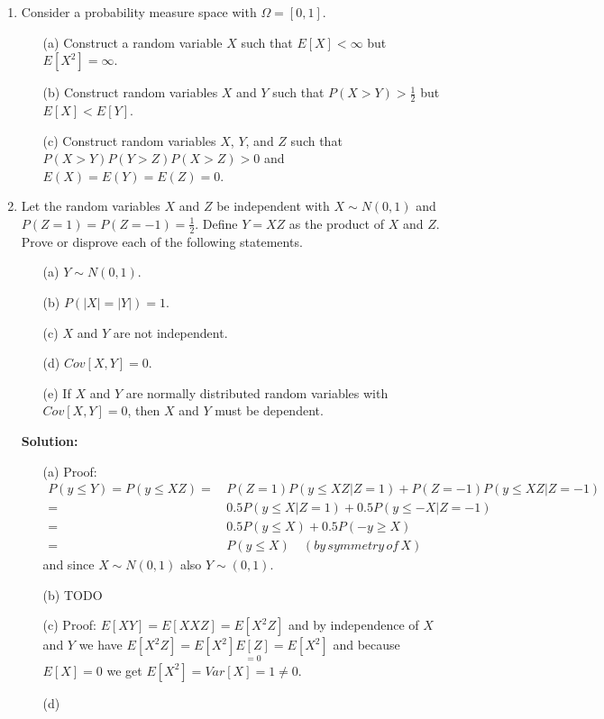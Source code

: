 \documentclass[letterpaper,12pt]{article}
\theoremstyle{definition}
\begin{document}
\begin{enumerate}
\item Consider a probability measure space with $\Omega = [0,1]$.
		\begin{itemize}
			\item[(a)] Construct a random variable $X$ such that $E[X] < \infty$ but $E[X^2] = \infty$.
			\item[(b)] Construct random variables $X$ and $Y$ such that $P(X>Y)>\frac{1}{2}$ but $E[X]<E[Y]$.
			\item[(c)] Construct random variables $X$, $Y$, and $Z$ such that\\ $P(X>Y) P(Y>Z) P(X>Z) > 0$ and 						$E(X)=E(Y)=E(Z)=0$.
		\end{itemize}

	\item Let the random variables $X$ and $Z$ be independent with $X \sim N(0,1)$ and $P(Z=1)=P(Z=-1)=\frac{1}{2}$. 			Define $Y= XZ$ as the product of $X$ and $Z$. Prove or disprove each of the following statements.
		\begin{itemize}
			\item[(a)] $Y \sim N(0,1)$.
			\item[(b)] $P(|X|=|Y|)=1$.
			\item[(c)] $X$ and $Y$ are not independent.
			\item[(d)] $Cov[X,Y]=0$.
			\item[(e)] If $X$ and $Y$ are normally distributed random variables with $Cov[X,Y]=0$, then $X$ and $Y$ 					must be dependent.
		\end{itemize}
\textbf{Solution:}
\begin{itemize}
			\item[(a)]Proof:\begin{align*}
			P(y \leq Y) = P(y \leq XZ) =& \, P(Z=1)P(y \leq XZ| Z=1) + P(Z=-1)P(y \leq XZ| Z=-1) \\
			=& \, 0.5P(y\leq X|Z=1) + 0.5P(y\leq -X|Z=-1)  \\
			=& \, 0.5 P(y \leq X) + 0.5P(-y\geq X) \\
			=& \, P(y \leq X)  \quad (by \, symmetry\,  of\,  X)
			\end{align*}
			and since $X \sim N(0,1)$ also $Y \sim (0,1)$.
			\item[(b)] TODO
			\item[(c)]Proof: $E[XY]=E[XXZ]=E[X^2Z]$ and by independence of $X$ and $Y$ we have $E[X^2Z]=E[X^2] \underset{=0}{E[Z]}=E[X^2]$ and because $E[X]=0$ we get $E[X^2]=Var[X]=1 \neq 0. \quad $
			\item[(d)] \begin{align*}

\end{align*}
\end{itemize}
\end{enumerate}
\end{document}
